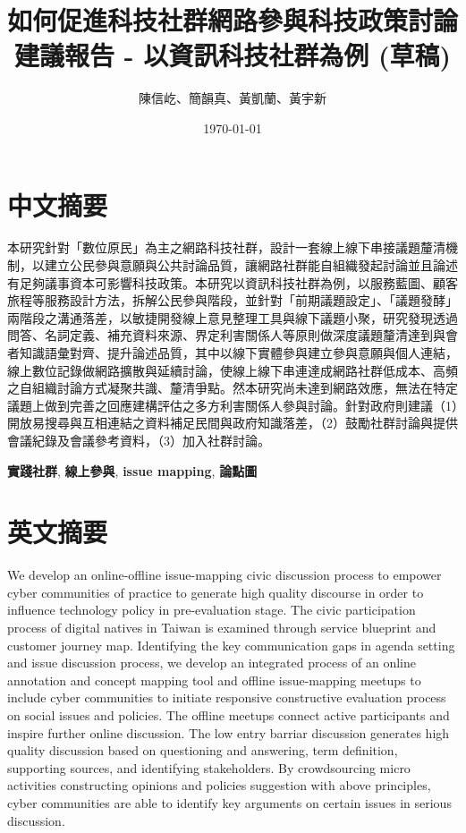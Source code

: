 \documentclass[12pt,a4paper]{article}
\author{陳信屹、簡韻真、黃凱蘭、黃宇新}
\date{\today}
\title{如何促進科技社群網路參與科技政策討論建議報告 - 以資訊科技社群為例 (草稿)}
\begin{document}
\maketitle
\tableofcontents

\listoftables
\listoffigures
\section{中文摘要}
\label{sec:org2d99149}
本研究針對「數位原民」為主之網路科技社群，設計一套線上線下串接議題釐清機制，以建立公民參與意願與公共討論品質，讓網路社群能自組織發起討論並且論述有足夠議事資本可影響科技政策。本研究以資訊科技社群為例，以服務藍圖、顧客旅程等服務設計方法，拆解公民參與階段，並針對「前期議題設定」、「議題發酵」兩階段之溝通落差，以敏捷開發線上意見整理工具與線下議題小聚，研究發現透過問答、名詞定義、補充資料來源、界定利害關係人等原則做深度議題釐清達到與會者知識語彙對齊、提升論述品質，其中以線下實體參與建立參與意願與個人連結，線上數位記錄做網路擴散與延續討論，使線上線下串連達成網路社群低成本、高頻之自組織討論方式凝聚共識、釐清爭點。然本研究尚未達到網路效應，無法在特定議題上做到完善之回應建構評估之多方利害關係人參與討論。針對政府則建議（1）開放易搜尋與互相連結之資料補足民間與政府知識落差，（2）鼓勵社群討論與提供會議紀錄及會議參考資料，（3）加入社群討論。

\textbf{實踐社群}, \textbf{線上參與}, \textbf{issue mapping}, \textbf{論點圖}
\section{英文摘要}
\label{sec:org48ae2d7}
We develop an online-offline issue-mapping civic discussion process to empower cyber communities of practice to generate high quality discourse in order to influence technology policy in pre-evaluation stage. The civic participation process of digital natives in Taiwan is examined through service blueprint and customer journey map. Identifying the key communication gaps in agenda setting and issue discussion process, we develop an integrated process of an online annotation and concept mapping tool and offline issue-mapping meetups to include cyber communities to initiate responsive constructive evaluation process on social issues and policies. The offline meetups connect active participants and inspire further online discussion. The low entry barriar discussion generates high quality discussion based on questioning and  answering, term definition, supporting sources, and identifying stakeholders. By crowdsourcing micro activities constructing opinions and policies suggestion with above principles, cyber communities are able to identify key arguments on certain issues in serious discussion.
\end{document}
